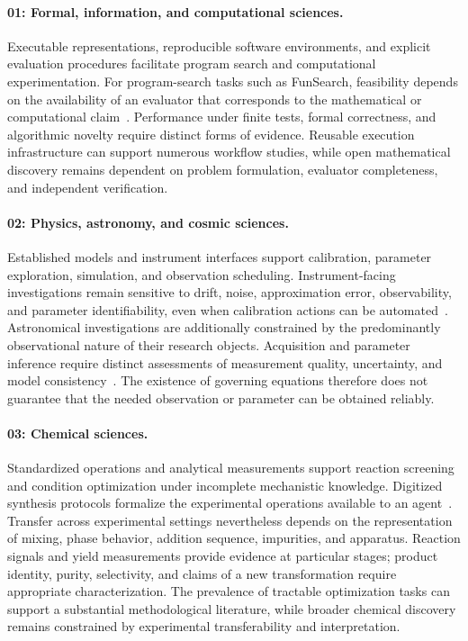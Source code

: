 \paragraph{01: Formal, information, and computational sciences.}
Executable representations, reproducible software environments, and explicit evaluation procedures facilitate program search and computational experimentation. For program-search tasks such as FunSearch, feasibility depends on the availability of an evaluator that corresponds to the mathematical or computational claim~\cite{asd0512}. Performance under finite tests, formal correctness, and algorithmic novelty require distinct forms of evidence. Reusable execution infrastructure can support numerous workflow studies, while open mathematical discovery remains dependent on problem formulation, evaluator completeness, and independent verification.

\paragraph{02: Physics, astronomy, and cosmic sciences.}
Established models and instrument interfaces support calibration, parameter exploration, simulation, and observation scheduling. Instrument-facing investigations remain sensitive to drift, noise, approximation error, observability, and parameter identifiability, even when calibration actions can be automated~\cite{asd0090}. Astronomical investigations are additionally constrained by the predominantly observational nature of their research objects. Acquisition and parameter inference require distinct assessments of measurement quality, uncertainty, and model consistency~\cite{asd0136,asd0121}. The existence of governing equations therefore does not guarantee that the needed observation or parameter can be obtained reliably.

\paragraph{03: Chemical sciences.}
Standardized operations and analytical measurements support reaction screening and condition optimization under incomplete mechanistic knowledge. Digitized synthesis protocols formalize the experimental operations available to an agent~\cite{asd0600}. Transfer across experimental settings nevertheless depends on the representation of mixing, phase behavior, addition sequence, impurities, and apparatus. Reaction signals and yield measurements provide evidence at particular stages; product identity, purity, selectivity, and claims of a new transformation require appropriate characterization. The prevalence of tractable optimization tasks can support a substantial methodological literature, while broader chemical discovery remains constrained by experimental transferability and interpretation.

